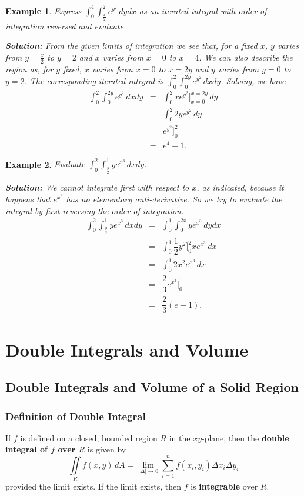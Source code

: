 \documentclass[titlepage,a4paper,12pt]{report}
\newtheorem{example}{Example}[section]
\begin{document}
\begin{example}
Express $\displaystyle \int _0^4\int _{\frac{x}{2}}^2 e^{y^2}\, dydx$ as an iterated integral with order of integration reversed and evaluate.

\noindent \textbf{Solution:} From the given limits of integration we see that, for a fixed $x$, $y$ varies from $y=\frac{x}{2}$ to $y=2$ and $x$ varies from $x=0$ to $x=4$. We can also describe the region as, for $y$ fixed, $x$ varies from $x=0$ to $x=2y$ and $y$ varies from $y=0$ to $y=2$. The corresponding iterated integral is $\displaystyle \int _0^2\int _0^{2y}e^{y^2}\, dxdy$.
Solving, we have
\begin{eqnarray*}
\int _0^2\int _0^{2y} e^{y^2}\, dxdy &=& \int _0^2xe^{y^2}\biggr]_{x=0}^{x=2y}\, dy \\
&=& \int _0^2 2ye^{y^2}\, dy \\
&=& e^{y^2}\biggr]_0^2 \\
&=& e^4-1.
\end{eqnarray*}
\end{example}
\begin{example}
Evaluate $\displaystyle \int _0^2\int _{\frac{y}{2}}^1 ye^{x^3}\, dxdy$.

\noindent \textbf{Solution:} We cannot integrate first with respect to $x$, as indicated, because it happens that $e^{x^3}$ has no elementary anti-derivative. So we try to evaluate the integral by first reversing the order of integration.
\begin{eqnarray*}
\int _0^2\int _{\frac{y}{2}}^1ye^{x^3}\, dxdy &=& \int _0^1\int _0^{2x}ye^{x^3}\, dydx\\
&=& \int _0^1 \dfrac{1}{2}y^2\biggl]_0^2x e^{x^3}\, dx\\
&=& \int _0^1 2x^2 e^{x^3}\, dx\\
&=& \dfrac{2}{3}e^{x^3}\biggl]_0^1\\
&=& \dfrac{2}{3}(e-1).
\end{eqnarray*}
\end{example}
\section{Double Integrals and Volume}
\subsection{Double Integrals and Volume of a Solid Region}
\subsubsection{Definition of Double Integral}
If $f$ is defined on a closed, bounded region $R$ in the $xy$-plane, then the \textbf{double integral of $f$ over $R$} is given by 
\[\iint \limits _R f(x,y)\, dA =\lim _{|\Delta|\rightarrow 0}\sum _{i=1}^n f(x_i, y_i)\Delta x_i \Delta y_i\] provided the limit exists. If the limit exists, then $f$ is \textbf{integrable} over $R$.
\end{document}

